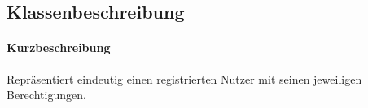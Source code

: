 \subsection{Klassenbeschreibung}%
\paragraph*{Kurzbeschreibung}
Repräsentiert eindeutig einen registrierten Nutzer mit seinen jeweiligen Berechtigungen.
